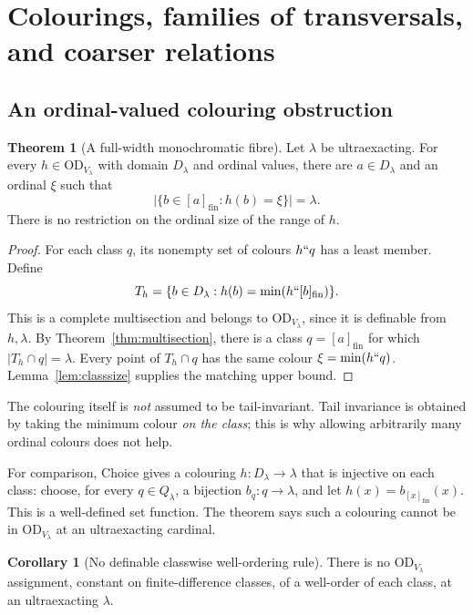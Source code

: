 \documentclass[11pt,letterpaper]{article}
\theoremstyle{definition}
\newtheorem{theorem}[definition]{Theorem}
\newtheorem{corollary}[definition]{Corollary}
\numberwithin{equation}{section}
\newcommand{\OD}{\mathrm{OD}}
\newcommand{\cl}[1]{[#1]_{\mathrm{fin}}}
\begin{document}
\section{Colourings, families of transversals, and coarser relations}\label{sec:consequences}

\subsection{An ordinal-valued colouring obstruction}

\begin{theorem}[A full-width monochromatic fibre]\label{thm:colour}
Let $\lambda$ be ultraexacting. For every $h\in\OD_{V_\lambda}$ with domain $D_\lambda$ and ordinal values, there are $a\in D_\lambda$ and an ordinal $\xi$ such that
\begin{equation}\label{eq:colour}
 \bigl|\{b\in\cl a:h(b)=\xi\}\bigr|=\lambda.
\end{equation}
There is no restriction on the ordinal size of the range of $h$.
\end{theorem}

\begin{proof}
For each class $q$, its nonempty set of colours $h``q$ has a least member. Define
\[
 T_h=\{b\in D_\lambda:h(b)=\min(h``\cl b)\}.
\]
This is a complete multisection and belongs to $\OD_{V_\lambda}$, since it is definable from $h,\lambda$. By Theorem~\ref{thm:multisection}, there is a class $q=\cl a$ for which $|T_h\cap q|=\lambda$. Every point of $T_h\cap q$ has the same colour $\xi=\min(h``q)$. Lemma~\ref{lem:classsize} supplies the matching upper bound.
\end{proof}

The colouring itself is \emph{not} assumed to be tail-invariant. Tail invariance is obtained by taking the minimum colour \emph{on the class}; this is why allowing arbitrarily many ordinal colours does not help.

For comparison, Choice gives a colouring $h:D_\lambda\to\lambda$ that is injective on each class: choose, for every $q\in Q_\lambda$, a bijection $b_q:q\to\lambda$, and let $h(x)=b_{\cl x}(x)$. This is a well-defined set function. The theorem says such a colouring cannot be in $\OD_{V_\lambda}$ at an ultraexacting cardinal.

\begin{corollary}[No definable classwise well-ordering rule]\label{cor:wellorders}
There is no $\OD_{V_\lambda}$ assignment, constant on finite-difference classes, of a well-order of each class, at an ultraexacting $\lambda$.
\end{corollary}
\end{document}

